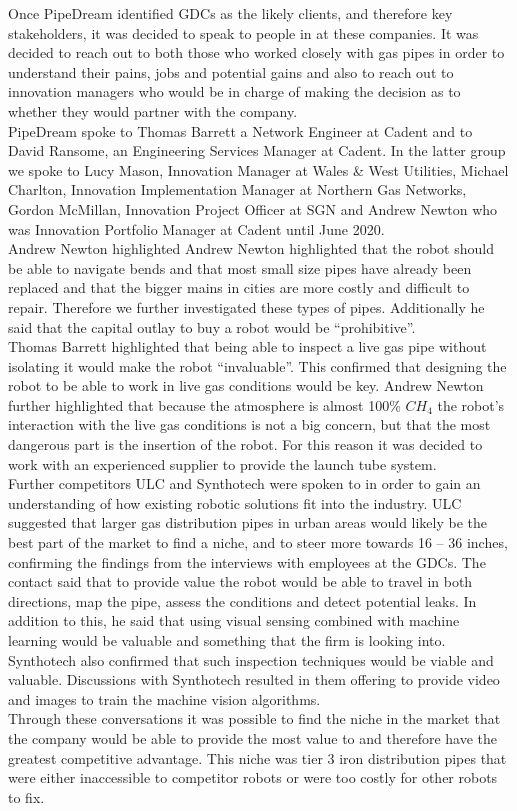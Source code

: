 \documentclass[11pt]{article}		%
\begin{document}
	        Once PipeDream identified GDCs as the likely clients, and therefore key stakeholders, it was decided to speak to people in at these companies. It was decided to reach out to both those who worked closely with gas pipes in order to understand their pains, jobs and potential gains and also to reach out to innovation managers who would be in charge of making the decision as to whether they would partner with the company.
	        \\
	         PipeDream spoke to Thomas Barrett a Network Engineer at Cadent and to David Ransome, an Engineering Services Manager at Cadent. In the latter group we spoke to Lucy Mason, Innovation Manager at Wales \& West Utilities, Michael Charlton, Innovation Implementation Manager at Northern Gas Networks, Gordon McMillan, Innovation Project Officer at SGN and Andrew Newton who was Innovation Portfolio Manager at Cadent until June 2020.
	        \\
	        Andrew Newton highlighted  Andrew Newton highlighted that the robot should be able to navigate bends and that most small size pipes have already been replaced and that the bigger mains in cities are more costly and difficult to repair. Therefore we further investigated these types of pipes. Additionally he said that the capital outlay to buy a robot would be “prohibitive”. 
	        \\
	        Thomas Barrett highlighted that being able to inspect a live gas pipe without isolating it would make the robot “invaluable”. This confirmed that designing the robot to be able to work in live gas conditions would be key. Andrew Newton further highlighted that because the atmosphere is almost 100\% ${CH}_4$ the robot’s interaction with the live gas conditions is not a big concern, but that the most dangerous part is the insertion of the robot. For this reason it was decided to work with an experienced supplier to provide the launch tube system.
	        \\
	        Further competitors ULC and Synthotech were spoken to in order to gain an understanding of how existing robotic solutions fit into the industry. ULC suggested that larger gas distribution pipes in urban areas would likely be the best part of the market to find a niche, and to steer more towards 16 – 36 inches, confirming the findings from the interviews with employees at the GDCs. The contact said that to provide value the robot would be able to travel in both directions, map the pipe, assess the conditions and detect potential leaks. In addition to this, he said that using visual sensing combined with machine learning would be valuable and something that the firm is looking into. Synthotech also confirmed that such inspection techniques would be viable and valuable. Discussions with Synthotech resulted in them offering to provide video and images to train the machine vision algorithms.
	        \\
	        Through these conversations it was possible to find the niche in the market that the company would be able to provide the most value to and therefore have the greatest competitive advantage. This niche was tier 3 iron distribution pipes that were either inaccessible to competitor robots or were too costly for other robots to fix.
        
\end{document}
